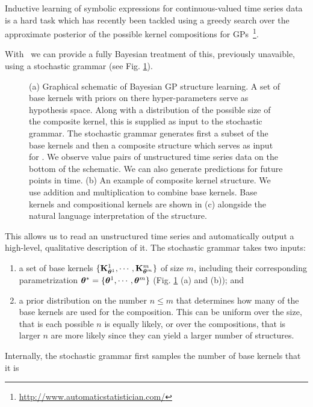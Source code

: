Inductive learning of symbolic expressions for continuous-valued time series
data is a hard task which has recently been tackled using a greedy search over 
the approximate posterior of the possible kernel compositions for
\ac{GP}s~\citep{duvenaud2013structure,lloyd2014automatic}\footnote{\url{http://www.automaticstatistician.com/}}.

With \gpmem\ we can provide a fully Bayesian treatment of this, previously unavaible,
using a stochastic grammar  (see Fig. \ref{fig:schema}).
\begin{figure}
\centering

\caption{\small(a) Graphical schematic of Bayesian GP structure learning. A set of
base kernels with priors on there hyper-parameters serve as hypothesis space.
Along with a distribution of the possible size of the composite kernel, this is
supplied as input to the stochastic grammar. The stochastic grammar generates
first a subset of the base kernels and then a composite structure which serves as input for
\gpmem.  We observe value pairs of unstructured time series data on the bottom of the schematic. We can also generate predictions for future points in time. (b) An example of composite kernel structure. We use addition and multiplication to combine base kernels.
Base kernels and compositional kernels are shown in (c) alongside the natural language interpretation of the structure.}\label{fig:schema}
\end{figure}
This allows us to read an unstructured time series and automatically output a high-level,
qualitative description of it. The stochastic grammar takes two inputs:
\begin{enumerate}
    \item a set of base kernels 
    $\{\mathbf{K}_{\bm{\theta}^1}^1,\cdots,\mathbf{K}_{\bm{\theta}^m}^m\}$
    of size $m$, including their corresponding parametrization
    $\bm{\theta}^*=\{\bm{\theta}^1,\cdots,\bm{\theta}^m\}$ (Fig. \ref{fig:schema} (a) and (b)); and
    \item a prior distribution on the number $n \leq m$ that determines how many of the base kernels are used for
    the composition. This can be uniform over the size, that is each possible
    $n$ is equally likely, or over the compositions, that is larger $n$ are more
    likely since they can yield a larger number of structures.
\end{enumerate}
Internally, the stochastic grammar first samples the number of base kernels that it is
